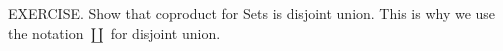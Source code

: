 EXERCISE. Show that coproduct for Sets is disjoint union. This is why we use the notation $\coprod$ for disjoint union.
